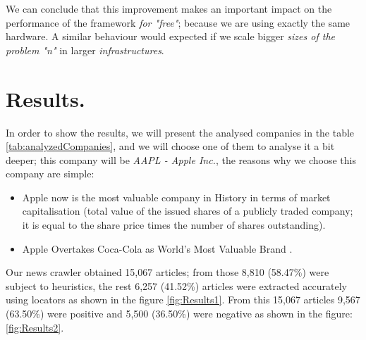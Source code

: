 We can conclude that this improvement makes an important impact on the performance of the framework \emph{for "free"}; because we are using exactly the same hardware. A similar behaviour would expected if we scale bigger \emph{sizes of the problem "n"} in larger \emph{infrastructures}.

\clearpage
\section{Results.}\label{ExperimentalResults1}

In order to show the results, we will present the analysed companies in the table \ref{tab:analyzedCompanies}, and we will choose one of them to analyse it a bit deeper; this company will be \emph{AAPL - Apple Inc.}, the reasons why we choose this company are simple: 
\begin{itemize}
	\item Apple now is the most valuable company in History \cite{BE2012} in terms of market capitalisation (total value of the issued shares of a publicly traded company; it is equal to the share price times the number of shares outstanding).
	\item Apple Overtakes Coca-Cola as World’s Most Valuable Brand \cite{AK2013}.
\end{itemize}
Our news crawler obtained 15,067 articles; from those 8,810 (58.47\%) were subject to heuristics, the rest 6,257 (41.52\%) articles were extracted accurately using locators as shown in the figure \ref{fig:Results1}. From this 15,067 articles 9,567 (63.50\%) were positive and 5,500 (36.50\%) were negative as shown in the figure: \ref{fig:Results2}.


\def\angle{0}
\def\radius{3}
\def\cyclelist{{"gray","silver","gray","silver","gray","silver","gray","silver"}}
\newcount\cyclecount {}
\newcount\ind {}

